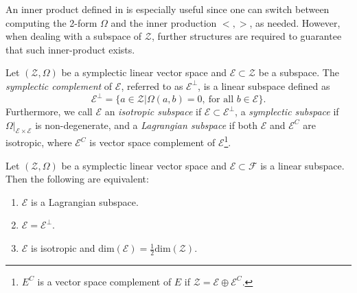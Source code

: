 An inner product defined in  is especially useful since one can switch between computing the 2-form $\Omega$ and the inner production $<,>$, as needed. However, when dealing with a subspace of $\mathcal Z$, further structures are required to guarantee that such inner-product exists.

\begin{definition} \cite{abraham1978foundations}
Let $(\mathcal Z, \Omega)$ be a symplectic linear vector space and $\mathcal E \subset \mathcal Z$ be a subspace. The \emph{symplectic complement} of $\mathcal E$, referred to as $\mathcal E^{\perp}$, is a linear subspace defined as
\begin{equation*}
	\mathcal E^{\perp} = \{ a \in \mathcal Z | \Omega(a,b) = 0, \ \text{for all } b \in \mathcal E \}.
\end{equation*}
Furthermore, we call $\mathcal E$ an \emph{isotropic subspace} if $\mathcal E\subset \mathcal E^{\perp}$, a \emph{symplectic subspace} if $\Omega|_{\mathcal E\times \mathcal E}$ is non-degenerate, and a \emph{Lagrangian subspace} if both $\mathcal E$ and $\mathcal E^C$ are isotropic, where $\mathcal E^C$ is vector space complement of $\mathcal E$\footnote{$E^{C}$ is a vector space complement of $E$ if $\mathcal{Z} = \mathcal E\oplus \mathcal E^C$. }.
\end{definition}
\begin{proposition} \label{theorem:2.13} \cite{abraham1978foundations}
Let $(\mathcal Z, \Omega)$ be a symplectic linear vector space and $\mathcal E\subset \mathcal F$ is a linear subspace. Then the following are equivalent:
\begin{enumerate} [label=(\alph*)]
\item $\mathcal E$ is a Lagrangian subspace.
\item $\mathcal E = \mathcal E^{\perp}$.
\item $\mathcal E$ is isotropic and dim$(\mathcal E) = \frac 1 2 \text{dim}(\mathcal Z)$.
\end{enumerate}
\end{proposition}
